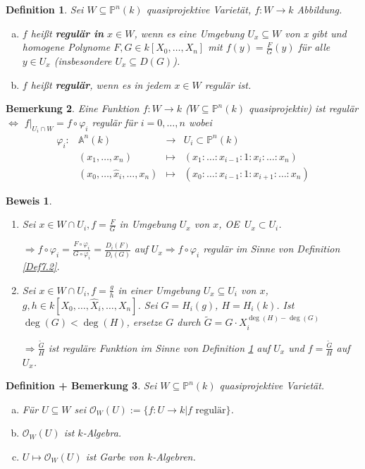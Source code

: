 \documentclass[a4paper, 12pt, numbers=noendperiod, chapterprefix=true, headsepline]{scrbook}
\theoremstyle{break}
\newtheorem{Def}{Definition}[section]
\newtheorem{DefBem}[Def]{Definition + Bemerkung}
\newtheorem{Bem}[Def]{Bemerkung}
\theoremstyle{nonumberbreak}
\newtheorem{Bew}{Beweis}
\theoremstyle{nonumberplain}
\newcommand{\quot}[1]{\textrm{\glqq}{#1}\textrm{\grqq}}
\newcommand{\emp}[1]{\textbf{\emph{#1}}}
\newcommand{\defterm}[1]{{\index{#1}}\emp{#1}}
\newcommand{\deftermspec}[2]{{\index{#2}}\emp{#1}}
\newenvironment{twosidedproof}{\begin{enumerate}[\quot{$\Rightarrow$}:]}{\end{enumerate}}
\newcommand{\proofforward}{\item[\quot{$\Rightarrow$}:]}
\newcommand{\proofreverse}{\item[\quot{$\Leftarrow$}:]}
\newcommand{\A}{\mathbb{A}}
\newcommand{\IP}{\mathbb{P}}%
\newcommand{\calO}{\mathcal{O}}
\renewcommand{\OE}{O\!\!E~}
\begin{document}
\begin{Def}\label{Def12.2}
Sei $W\subseteq\IP^n(k)$ quasiprojektive Variet\"at, $f:W\to k$ Abbildung.\begin{enumerate}[a)]
\item
	$f$ hei\ss t \deftermspec{regul\"ar in}{regul\"ar!in $x$} $x\in W$, wenn es eine Umgebung $U_x\subseteq W$ von x gibt und homogene Polynome $F, G \in k[X_0,\ldots ,X_n]$ mit $f(y)=\frac{F}{G}(y)$ f\"ur alle $y\in U_x$ (insbesondere $U_x\subseteq D(G)$).

\item
	$f$ hei\ss t \defterm{regul\"ar}, wenn es in jedem $x\in W$ regul\"ar ist.
\end{enumerate}\end{Def}

\begin{Bem}
Eine Funktion $f:W \to k$ ($W\subseteq\IP^n(k)$ quasiprojektiv) ist regul\"ar $\Leftrightarrow$ $f|_{U_i\cap W}=f\circ \varphi_i$ regul\"ar f\"ur $i=0,\ldots ,n$ wobei
	\[\begin{array}{lrcl}
		\varphi_i: & \A^n(k) &\to& U_i\subset \IP^n(k)\\
		& (x_1,\ldots ,x_n) & \mapsto & (x_1:\ldots :x_{i-1}:1:x_i:\ldots :x_n)\\
		& (x_0,\ldots ,\hat x_i,\ldots ,x_n) &\mapsto& (x_0:\ldots :x_{i-1}:1:x_{i+1}:\ldots :x_n)
	\end{array}\]
\end{Bem}

\begin{Bew}\begin{twosidedproof}
\proofforward
	Sei  $x\in W\cap U_i, f=\frac{F}{G}$ in Umgebung $U_x$ von $x$, \OE $U_x\subset U_i$.
	
	$\Rightarrow f\circ \varphi_i=\frac{F\circ \varphi_i}{G\circ \varphi_i}=\frac{D_i(F)}{D_i(G)}$ auf $U_x \Rightarrow f\circ \varphi_i$ regul\"ar im Sinne von Definition \ref{Def7.2}.
\proofreverse
	Sei $x\in W\cap U_i, f=\frac{g}{h}$ in einer Umgebung $U_x\subseteq U_i$ von $x$, $g,h\in k[X_0,\ldots ,\widehat X_i,\ldots ,X_n]$. Sei $G=H_i(g)$, $H=H_i(k)$. Ist $\deg(G)<\deg(H)$, ersetze $G$ durch $\widetilde G=G\cdot X_i^{\deg(H)-\deg(G)}$
	
	$\Rightarrow \frac{\widetilde G}{H}$ ist regul\"are Funktion im Sinne von Definition \ref{Def12.2} auf $U_x$ und $f=\frac{\widetilde G}{H}$ auf $U_x$.
\end{twosidedproof}\end{Bew}

\begin{DefBem}
Sei $W\subseteq\IP^n(k)$ quasiprojektive Variet\"at.\begin{enumerate}[a)]
\item
	F\"ur $U\subseteq W$ sei $\calO_W(U):=\{f:U\to k\vert f \text{ regul\"ar}\}$.
\item
	$\calO_W(U)$ ist $k$-Algebra.
\item
	$U\mapsto\calO_W(U)$ ist Garbe von $k$-Algebren.
\end{enumerate}\end{DefBem}
\end{document}
